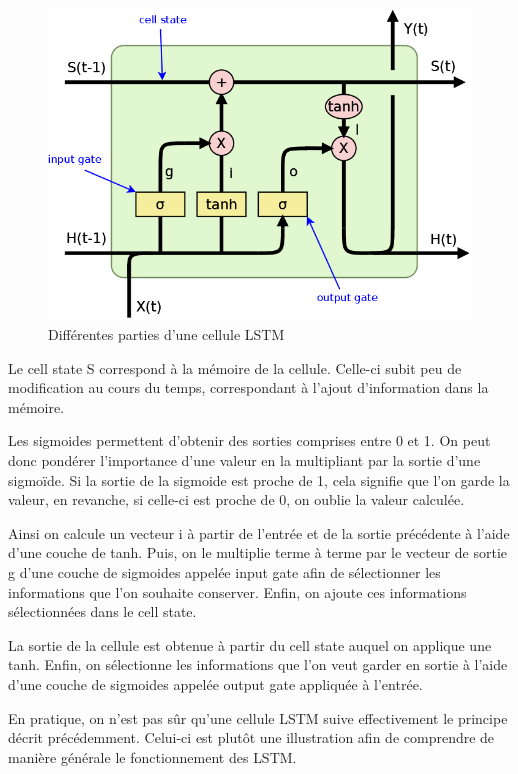 \documentclass{report}
\theoremstyle{plain}
\theoremstyle{definition}
\theoremstyle{remark}
\begin{document}
\begin{figure}[h!]
\begin{center}
\includegraphics[scale=0.2]{images/LSTM_article_gates.png}
\caption{Différentes parties d'une cellule LSTM}
\label{cellule LSTM gates}
\end{center}
\end{figure}

Le cell state S correspond à la mémoire de la cellule. Celle-ci subit peu de modification au cours du temps, correspondant à l'ajout d'information dans la mémoire.

Les sigmoides permettent d'obtenir des sorties comprises entre 0 et 1. On peut donc pondérer l'importance d'une valeur en la multipliant par la sortie d'une sigmoïde. Si la sortie de la sigmoide est proche de 1, cela signifie que l'on garde la valeur, en revanche, si celle-ci est proche de 0, on oublie la valeur calculée.

Ainsi on calcule un vecteur i à partir de l'entrée et de la sortie précédente à l'aide d'une couche de tanh. Puis, on le multiplie terme à terme par le vecteur de sortie g d'une couche de sigmoides appelée input gate afin de sélectionner les informations que l'on souhaite conserver. Enfin, on ajoute ces informations sélectionnées dans le cell state. 

La sortie de la cellule est obtenue à partir du cell state auquel on applique une tanh. Enfin, on sélectionne les informations que l'on veut garder en sortie à l'aide d'une couche de sigmoides appelée output gate appliquée à l'entrée.


En pratique, on n'est pas sûr qu'une cellule LSTM suive effectivement le principe décrit précédemment. Celui-ci est plutôt une illustration afin de comprendre de manière générale le fonctionnement des LSTM.
\end{document}
